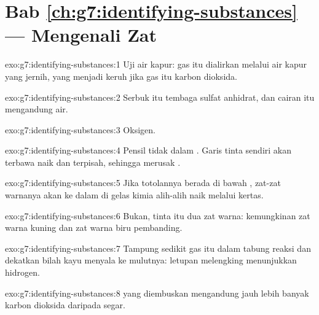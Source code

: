 \section*{Bab \ref{ch:g7:identifying-substances} --- Mengenali Zat}

\begin{solution}{exo:g7:identifying-substances:1}
Uji air kapur: gas itu dialirkan melalui air kapur yang jernih, yang
menjadi keruh jika gas itu karbon dioksida.
\end{solution}

\begin{solution}{exo:g7:identifying-substances:2}
Serbuk itu tembaga sulfat anhidrat, dan cairan itu mengandung air.
\end{solution}

\begin{solution}{exo:g7:identifying-substances:3}
Oksigen.
\end{solution}

\begin{solution}{exo:g7:identifying-substances:4}
Pensil tidak  dalam . Garis tinta sendiri akan terbawa naik
dan terpisah, sehingga merusak .
\end{solution}

\begin{solution}{exo:g7:identifying-substances:5}
Jika totolannya berada di bawah , zat-zat warnanya akan  ke
dalam  di gelas kimia alih-alih naik melalui kertas.
\end{solution}

\begin{solution}{exo:g7:identifying-substances:6}
Bukan, tinta itu  dua zat warna: kemungkinan zat warna kuning
dan zat warna biru pembanding.
\end{solution}

\begin{solution}{exo:g7:identifying-substances:7}
Tampung sedikit gas itu dalam tabung reaksi dan dekatkan bilah kayu
menyala ke mulutnya: letupan melengking menunjukkan hidrogen.
\end{solution}

\begin{solution}{exo:g7:identifying-substances:8}
 yang diembuskan mengandung jauh lebih banyak karbon dioksida
daripada  segar.
\end{solution}

